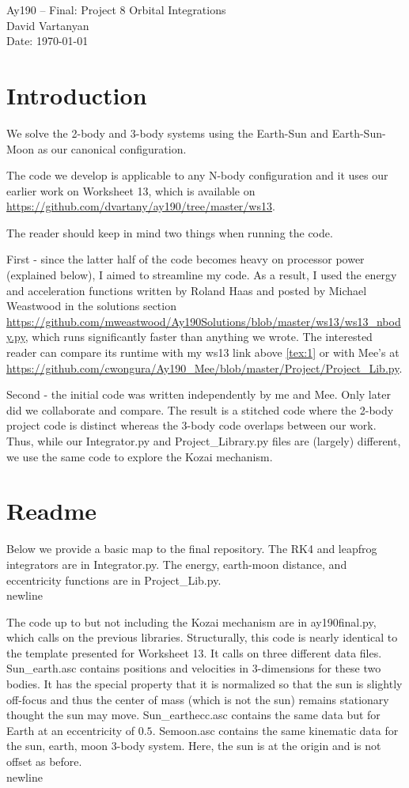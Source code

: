 \documentclass[11pt,letterpaper]{article}
\begin{document}
\begin{center}
\Large
Ay190 -- Final: Project 8 Orbital Integrations \\
David Vartanyan\\
Date: \today
\end{center}

\section{Introduction}
We solve the 2-body and 3-body systems using the Earth-Sun and Earth-Sun-Moon as our canonical configuration.

The code we develop is applicable to any N-body configuration and it uses our earlier work on Worksheet 13, which is available on \url{https://github.com/dvartany/ay190/tree/master/ws13}\label{tex:1}.

The reader should keep in mind two things when running the code.

First - since the latter half of the code becomes heavy on processor power (explained below), I aimed to streamline my code. As a result, I used the energy and acceleration functions written by Roland Haas and posted by Michael Weastwood in the solutions section \url{https://github.com/mweastwood/Ay190Solutions/blob/master/ws13/ws13_nbody.py}, which runs significantly faster than anything we wrote. The interested reader can compare its runtime with my ws13 link above \ref{tex:1} or with Mee's at \url{https://github.com/cwongura/Ay190_Mee/blob/master/Project/Project_Lib.py}.

Second - the initial code was written independently by me and Mee. Only later did we collaborate and compare. The result is a stitched code where the 2-body project code is distinct whereas the 3-body code overlaps between our work. Thus, while our Integrator.py and Project\_Library.py files are (largely) different, we use the same code to explore the Kozai mechanism.

\section{Readme}
Below we provide a basic map to the final repository. The RK4 and leapfrog integrators are in Integrator.py. The energy, earth-moon distance, and eccentricity functions are in Project\_Lib.py.\\newline

The code up to but not including the Kozai mechanism are in ay190final.py, which calls on the previous libraries. Structurally, this code is nearly identical to the template presented for Worksheet 13. It calls on three different data files. Sun\_earth.asc contains positions and velocities in 3-dimensions for these two bodies. It has the special property that it is normalized so that the sun is slightly off-focus and thus the center of mass (which is not the sun) remains stationary thought the sun may move. Sun\_earthecc.asc contains the same data but for Earth at an eccentricity of $0.5$. Semoon.asc contains the same kinematic data for the sun, earth, moon 3-body system. Here, the sun is at the origin and is not offset as before.\\newline
\end{document}
